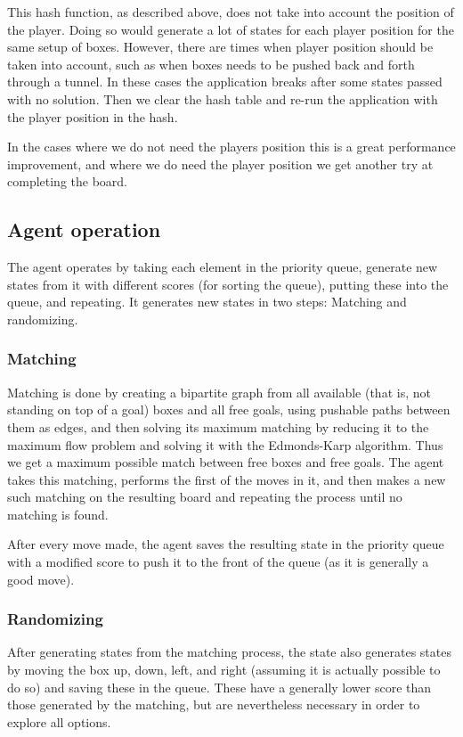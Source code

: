\documentclass[article,11pt]{article}
\begin{document}
This hash function, as described above, does not take into account the
position of the player. Doing so would generate a lot of states for
each player position for the same setup of boxes. However, there are
times when player position should be taken into account, such as when
boxes needs to be pushed back and forth through a tunnel. In these
cases the application breaks after some states passed with no
solution. Then we clear the hash table and re-run the application with
the player position in the hash. 

In the cases where we do not need the players position this is a great
performance improvement, and where we do need the player position we
get another try at completing the board.

\subsection{Agent operation}
The agent operates by taking each element in the priority queue,
generate new states from it with different scores (for sorting the
queue), putting these into the queue, and repeating. It generates new
states in two steps: Matching and randomizing.

\subsubsection{Matching}
Matching is done by creating a bipartite graph from all available
(that is, not standing on top of a goal) boxes and all free goals,
using pushable paths between them as edges, and then solving its
maximum matching by reducing it to the maximum flow problem and
solving it with the Edmonds-Karp algorithm. Thus we get a maximum
possible match between free boxes and free goals. The agent takes this
matching, performs the first of the moves in it, and then makes a new
such matching on the resulting board and repeating the process until
no matching is found.

After every move made, the agent saves the resulting state in the
priority queue with a modified score to push it to the front of the
queue (as it is generally a good move).

\subsubsection{Randomizing}
After generating states from the matching process, the state also
generates states by moving the box up, down, left, and right (assuming
it is actually possible to do so) and saving these in the queue. These
have a generally lower score than those generated by the matching, but
are nevertheless necessary in order to explore all options.
\end{document}
